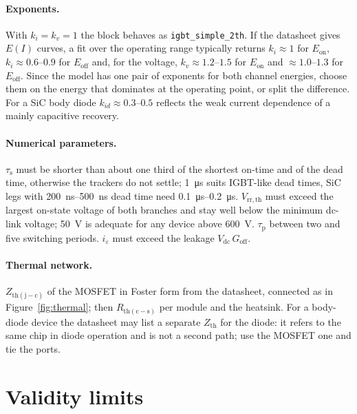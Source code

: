 \documentclass[11pt,a4paper]{article}
\newcommand{\Eon}{E_{\mathrm{on}}}
\newcommand{\Eoff}{E_{\mathrm{off}}}
\newcommand{\Vdc}{V_{\mathrm{dc}}}
\newcommand{\taus}{\tau_{\mathrm{s}}}
\newcommand{\taup}{\tau_{\mathrm{p}}}
\newcommand{\code}[1]{\texttt{#1}}
\begin{document}
\paragraph{Exponents.} With $k_i = k_v = 1$ the block behaves as
\code{igbt\_simple\_2th}. If the datasheet gives $E(I)$ curves, a fit over the
operating range typically returns $k_i \approx 1$ for $\Eon$,
$k_i \approx \numrange{0.6}{0.9}$ for $\Eoff$ and, for the voltage,
$k_v \approx \numrange{1.2}{1.5}$ for $\Eon$ and $\approx\numrange{1.0}{1.3}$
for $\Eoff$. Since the model has one pair of exponents for both channel
energies, choose them on the energy that dominates at the operating point,
or split the difference. For a SiC body diode $k_{id} \approx \numrange{0.3}{0.5}$
reflects the weak current dependence of a mainly capacitive recovery.

\paragraph{Numerical parameters.} $\taus$ must be shorter than about one third
of the shortest on-time and of the dead time, otherwise the trackers do not
settle; \SI{1}{\micro\second} suits IGBT-like dead times, SiC legs with
\SIrange{200}{500}{\nano\second} dead time need \SIrange{0.1}{0.2}{\micro\second}.
$V_\mathrm{rr,th}$ must exceed the largest on-state voltage of both branches and
stay well below the minimum dc-link voltage; \SI{50}{\volt} is adequate for any
device above \SI{600}{\volt}. $\taup$ between two and five switching periods.
$i_\varepsilon$ must exceed the leakage $\Vdc\,G_\mathrm{off}$.

\paragraph{Thermal network.} $Z_\mathrm{th(j-c)}$ of the MOSFET in Foster form
from the datasheet, connected as in Figure~\ref{fig:thermal}; then
$R_\mathrm{th(c-s)}$ per module and the heatsink. For a body-diode device the
datasheet may list a separate $Z_\mathrm{th}$ for the diode: it refers to the
same chip in diode operation and is not a second path; use the MOSFET one and
tie the ports.

\section{Validity limits}
\end{document}
